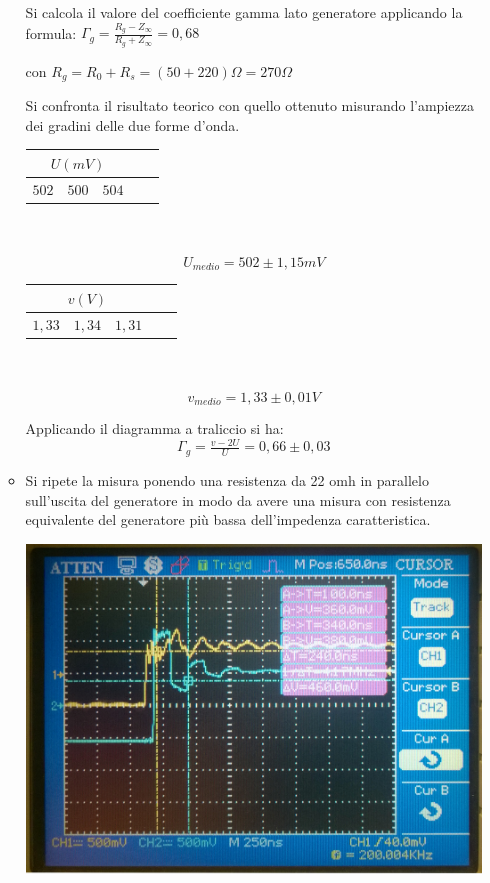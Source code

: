 \documentclass[a4paper]{article}
\begin{document}
\begin{itemize}
\begin{itemize}
Si calcola il valore del coefficiente gamma lato generatore applicando la formula: 
\(\Gamma _g=\tfrac{R_g-Z_\infty}{R_g+Z_\infty}= 0,68\)

con \(R_g=R_0+R_s=(50+220)\Omega=270\Omega\)

Si confronta il risultato teorico con quello ottenuto misurando l’ampiezza dei gradini delle due forme d’onda.
\begin{center}
 \begin{tabular}{|r|l|l|l|l|}
     \hline
     \multicolumn{3}{|c|}{\(U (mV)\)} \\
     \hline
     \(502\) & \(500\) & \(504\)\\
     \hline
   \end{tabular} \\ \\
\[U_{medio}=502 \pm 1,15 mV\]

\begin{tabular}{|r|l|l|l|l|}
     \hline
     \multicolumn{3}{|c|}{\(v (V)\)} \\
     \hline
     \(1,33\) & \(1,34\) & \(1,31\)\\
     \hline
   \end{tabular} \\ \\
\[v_{medio}=1,33 \pm 0,01 V\]
\end{center}
Applicando il diagramma a traliccio si ha:
\[\Gamma_g = \tfrac{v-2U}{U} = 0,66 \pm 0,03 \]
\item Si ripete la misura ponendo una resistenza da 22 omh in parallelo sull’uscita del generatore in modo da avere una misura con resistenza equivalente del generatore più bassa dell’impedenza caratteristica.

\begin{center}
\includegraphics[scale=0.09]{foto/foto15.jpg}
\end{center}


\end{itemize}
\end{itemize}
\end{document}
